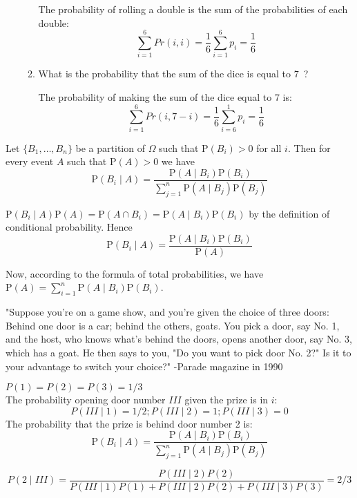 \documentclass[a4paper,11pt]{exam}
\renewcommand{\P}{\mathrm{P}}
\begin{document}
\begin{questions}
\begin{enumerate}
\begin{enumerate}
		\begin{solution}
			The probability of rolling a double is the sum of the probabilities of each double:
			\[
			\sum_{i=1}^6 Pr(i,i) = \frac{1}{6} \sum_{i=1}^6 p_i = \frac{1}{6}
			\]
		\end{solution}
		
		\item What is the probability that the sum of the dice is equal to $7$~?
		
		\begin{solution}
			The probability of making the sum of the dice equal to 7 is:
			\[
			\sum_{i=1}^6 Pr(i,7-i) = \frac{1}{6} \sum_{i=6}^1 p_i
			= \frac{1}{6}
			\]
		\end{solution}
	\end{enumerate}
\end{enumerate}

\question
Let $\{B_1,\dots,B_n\}$ be a partition of $\Omega$ such that $\P(B_i) > 0$ for all $i$.
Then for every event $A$ such that $\P(A) > 0$ we have
\[
\P(B_i \mid A)
= \frac{\P(A \mid B_i)\P(B_i)}{\sum_{j = 1}^n \P(A \mid B_j) \P(B_j)}
\]

\begin{solution}
	$\P(B_i \mid A) \P(A) = \P(A \cap B_i) = \P(A \mid B_i)\P(B_i)$ by the definition of conditional probability.
	Hence
	\[
	\P(B_i \mid A) = \frac{\P(A \mid B_i)\P(B_i)}{\P(A)}
	\]
	
	Now, according to the formula of total probabilities, we have
	$\P(A) = \sum_{i = 1}^n \P(A \mid B_i) \P(B_i)$.
\end{solution} 

"Suppose you're on a game show, and you're given the choice of three doors: Behind one door is a car; behind the others, goats. You pick a door, say No. 1, and the host, who knows what's behind the doors, opens another door, say No. 3, which has a goat. He then says to you, "Do you want to pick door No. 2?" Is it to your advantage to switch your choice?" -Parade magazine in 1990

\begin{solution}
	$P(1)=P(2)=P(3)=1/3$\\
	The probability opening  door number $III$ given the prize is in $i$:  
	\[P(III\mid1)=1/2  ;  P(III\mid2)=1 ; P(III\mid3)=0\]
	The probability that the prize is behind door number 2  is:
	\[
	\P(B_i \mid A)
	= \frac{\P(A \mid B_i)\P(B_i)}{\sum_{j = 1}^n \P(A \mid B_j) \P(B_j)}
	\]
	
	\[
	P(2\mid III)=\frac{P(III\mid 2)P(2)}{P(III\mid 1)P(1)+P(III\mid 2)P(2)+P(III\mid 3)P(3)} = 2/3
	\]
\end{solution}




\end{questions}
\end{document}
